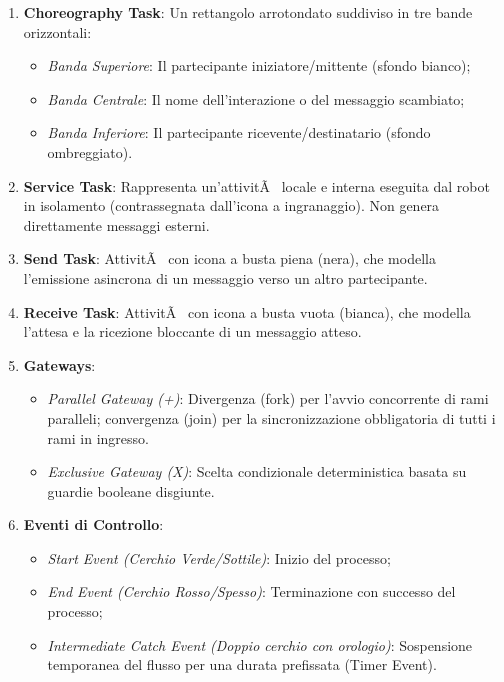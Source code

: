 ﻿\documentclass[11pt, a4paper]{report}
\begin{document}
\begin{enumerate}
    \item \textbf{Choreography Task}: Un rettangolo arrotondato suddiviso in tre bande orizzontali:
    \begin{itemize}
        \item \textit{Banda Superiore}: Il partecipante iniziatore/mittente (sfondo bianco);
        \item \textit{Banda Centrale}: Il nome dell'interazione o del messaggio scambiato;
        \item \textit{Banda Inferiore}: Il partecipante ricevente/destinatario (sfondo ombreggiato).
    \end{itemize}
    \item \textbf{Service Task}: Rappresenta un'attivitÃ  locale e interna eseguita dal robot in isolamento (contrassegnata dall'icona a ingranaggio). Non genera direttamente messaggi esterni.
    \item \textbf{Send Task}: AttivitÃ  con icona a busta piena (nera), che modella l'emissione asincrona di un messaggio verso un altro partecipante.
    \item \textbf{Receive Task}: AttivitÃ  con icona a busta vuota (bianca), che modella l'attesa e la ricezione bloccante di un messaggio atteso.
    \item \textbf{Gateways}:
    \begin{itemize}
        \item \textit{Parallel Gateway (+)}: Divergenza (fork) per l'avvio concorrente di rami paralleli; convergenza (join) per la sincronizzazione obbligatoria di tutti i rami in ingresso.
        \item \textit{Exclusive Gateway (X)}: Scelta condizionale deterministica basata su guardie booleane disgiunte.
    \end{itemize}
    \item \textbf{Eventi di Controllo}:
    \begin{itemize}
        \item \textit{Start Event (Cerchio Verde/Sottile)}: Inizio del processo;
        \item \textit{End Event (Cerchio Rosso/Spesso)}: Terminazione con successo del processo;
        \item \textit{Intermediate Catch Event (Doppio cerchio con orologio)}: Sospensione temporanea del flusso per una durata prefissata (Timer Event).
    \end{itemize}
\end{enumerate}
\end{document}
